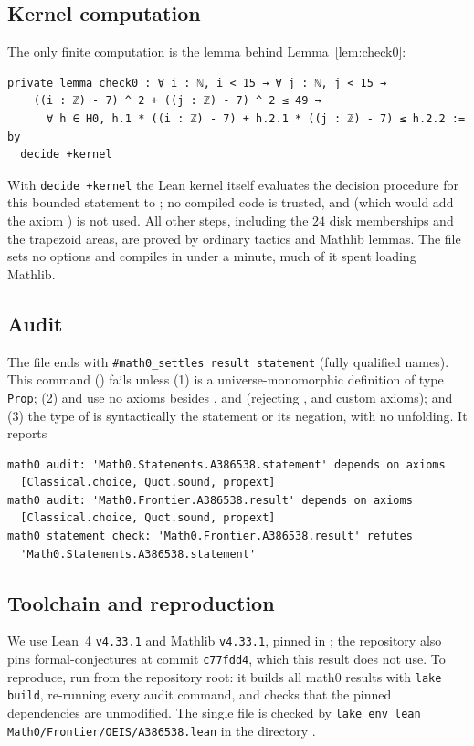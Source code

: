 \documentclass[11pt]{amsart}
\theoremstyle{plain}
\theoremstyle{definition}
\begin{document}
\subsection*{Kernel computation}
The only finite computation is the lemma behind Lemma~\ref{lem:check0}:
\begin{lstlisting}
private lemma check0 : ∀ i : ℕ, i < 15 → ∀ j : ℕ, j < 15 →
    ((i : ℤ) - 7) ^ 2 + ((j : ℤ) - 7) ^ 2 ≤ 49 →
      ∀ h ∈ H0, h.1 * ((i : ℤ) - 7) + h.2.1 * ((j : ℤ) - 7) ≤ h.2.2 := by
  decide +kernel
\end{lstlisting}
With \texttt{decide +kernel} the Lean kernel itself evaluates the decision procedure for this bounded statement to ; no compiled code is trusted, and  (which would add the axiom ) is not used. All other steps, including the $24$ disk memberships and the trapezoid areas, are proved by ordinary tactics and Mathlib lemmas. The file sets no options and compiles in under a minute, much of it spent loading Mathlib.

\subsection*{Audit}
The file ends with \texttt{\#math0\_settles result statement} (fully qualified names). This command () fails unless (1)  is a universe-monomorphic definition of type \texttt{Prop}; (2)  and  use no axioms besides ,  and  (rejecting ,  and custom axioms); and (3) the type of  is syntactically the statement or its negation, with no unfolding. It reports
\begin{lstlisting}
math0 audit: 'Math0.Statements.A386538.statement' depends on axioms
  [Classical.choice, Quot.sound, propext]
math0 audit: 'Math0.Frontier.A386538.result' depends on axioms
  [Classical.choice, Quot.sound, propext]
math0 statement check: 'Math0.Frontier.A386538.result' refutes
  'Math0.Statements.A386538.statement'
\end{lstlisting}

\subsection*{Toolchain and reproduction}
We use Lean~4 \cite{Lean4} \texttt{v4.33.1} and Mathlib \cite{Mathlib} \texttt{v4.33.1}, pinned in ; the repository also pins formal-conjectures \cite{FC} at commit \texttt{c77fdd4}, which this result does not use.
To reproduce, run  from the repository root: it builds all math0 results with \texttt{lake build}, re-running every audit command, and checks that the pinned dependencies are unmodified. The single file is checked by \texttt{lake env lean Math0/Frontier/OEIS/A386538.lean} in the directory .
\end{document}
